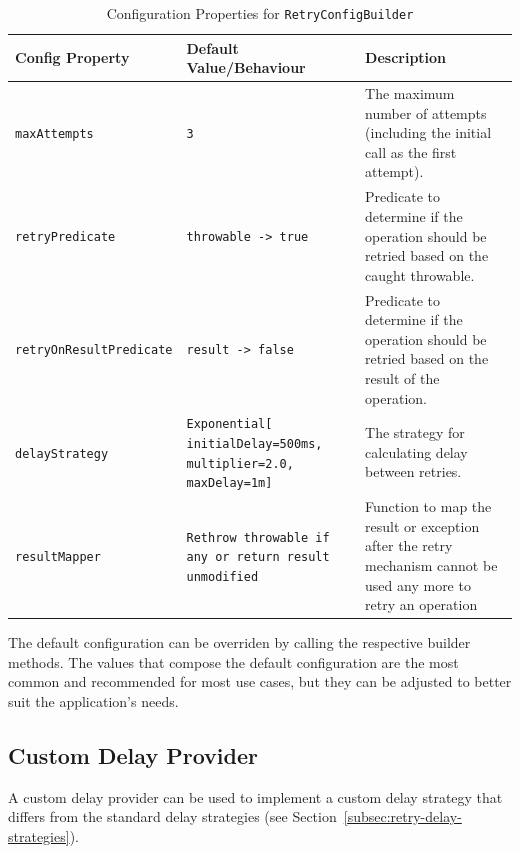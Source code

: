 \begin{table}[!htb]
    \centering
    \caption{Configuration Properties for \texttt{RetryConfigBuilder}}
    \label{tab:retry-config-builder}
    \vspace{0.3cm}
    \begin{tabular}{|l|p{5cm}|p{6cm}|}
        \hline
        \textbf{Config Property}        & \textbf{Default Value/Behaviour}                                       & \textbf{Description}                                                                            \\ \hline
        \texttt{maxAttempts} & \texttt{3} & The maximum number of attempts
        (including the initial call as the first attempt). \\ \hline
        \texttt{retryPredicate} & \texttt{throwable ->
            true} & Predicate
        to determine if the operation should be retried based on the caught throwable. \\ \hline
        \texttt{retryOnResultPredicate} & \texttt{result ->
            false} & Predicate
        to determine if the operation should be retried based on the result of the operation. \\ \hline
        \texttt{delayStrategy} & \texttt{Exponential[ initialDelay=500ms, multiplier=2.0, maxDelay=1m]}          & The strategy
        for calculating delay between retries.                                             \\ \hline
        \texttt{resultMapper} & \texttt{Rethrow throwable
        if any or return result unmodified}          & Function
        to map the result or exception after the retry mechanism cannot be used any more to retry an operation                            \\ \hline
    \end{tabular}
\end{table}

The default configuration can be overriden by calling the respective builder methods.
The values that compose the default configuration are the most common and recommended for most use cases,
but they can be adjusted to better suit the application's needs.

\subsection{Custom Delay Provider}\label{subsec:retry-custom-delay-provider}

A custom delay provider can be used
to implement a custom delay strategy that differs from the standard delay strategies
(see Section~\ref{subsec:retry-delay-strategies}).


